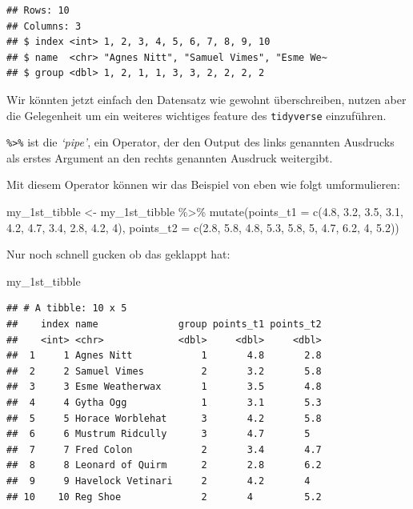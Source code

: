 \documentclass[
]{book}
\newenvironment{Shaded}{\begin{snugshade}}{\end{snugshade}}
\newcommand{\AttributeTok}[1]{\textcolor[rgb]{0.77,0.63,0.00}{#1}}
\newcommand{\DecValTok}[1]{\textcolor[rgb]{0.00,0.00,0.81}{#1}}
\newcommand{\FloatTok}[1]{\textcolor[rgb]{0.00,0.00,0.81}{#1}}
\newcommand{\FunctionTok}[1]{\textcolor[rgb]{0.00,0.00,0.00}{#1}}
\newcommand{\NormalTok}[1]{#1}
\newcommand{\OtherTok}[1]{\textcolor[rgb]{0.56,0.35,0.01}{#1}}
\newcommand{\SpecialCharTok}[1]{\textcolor[rgb]{0.00,0.00,0.00}{#1}}
\begin{document}
\begin{verbatim}
## Rows: 10
## Columns: 3
## $ index <int> 1, 2, 3, 4, 5, 6, 7, 8, 9, 10
## $ name  <chr> "Agnes Nitt", "Samuel Vimes", "Esme We~
## $ group <dbl> 1, 2, 1, 1, 3, 3, 2, 2, 2, 2
\end{verbatim}

Wir könnten jetzt einfach den Datensatz wie gewohnt überschreiben, nutzen aber die Gelegenheit um ein weiteres wichtiges feature des \texttt{tidyverse} einzuführen.

\texttt{\%\textgreater{}\%} ist die \emph{`pipe'}, ein Operator, der den Output des links genannten Ausdrucks als erstes Argument an den rechts genannten Ausdruck weitergibt.

Mit diesem Operator können wir das Beispiel von eben wie folgt umformulieren:

\begin{Shaded}
\begin{Highlighting}[]
\NormalTok{my\_1st\_tibble }\OtherTok{\textless{}{-}}\NormalTok{ my\_1st\_tibble }\SpecialCharTok{\%\textgreater{}\%} 
  \FunctionTok{mutate}\NormalTok{(}\AttributeTok{points\_t1 =} \FunctionTok{c}\NormalTok{(}\FloatTok{4.8}\NormalTok{, }\FloatTok{3.2}\NormalTok{, }\FloatTok{3.5}\NormalTok{, }\FloatTok{3.1}\NormalTok{, }\FloatTok{4.2}\NormalTok{, }\FloatTok{4.7}\NormalTok{, }\FloatTok{3.4}\NormalTok{, }\FloatTok{2.8}\NormalTok{, }\FloatTok{4.2}\NormalTok{, }\DecValTok{4}\NormalTok{),}
         \AttributeTok{points\_t2 =} \FunctionTok{c}\NormalTok{(}\FloatTok{2.8}\NormalTok{, }\FloatTok{5.8}\NormalTok{, }\FloatTok{4.8}\NormalTok{, }\FloatTok{5.3}\NormalTok{, }\FloatTok{5.8}\NormalTok{, }\DecValTok{5}\NormalTok{, }\FloatTok{4.7}\NormalTok{, }\FloatTok{6.2}\NormalTok{, }\DecValTok{4}\NormalTok{, }\FloatTok{5.2}\NormalTok{))}
\end{Highlighting}
\end{Shaded}

Nur noch schnell gucken ob das geklappt hat:

\begin{Shaded}
\begin{Highlighting}[]
\NormalTok{my\_1st\_tibble}
\end{Highlighting}
\end{Shaded}

\begin{verbatim}
## # A tibble: 10 x 5
##    index name              group points_t1 points_t2
##    <int> <chr>             <dbl>     <dbl>     <dbl>
##  1     1 Agnes Nitt            1       4.8       2.8
##  2     2 Samuel Vimes          2       3.2       5.8
##  3     3 Esme Weatherwax       1       3.5       4.8
##  4     4 Gytha Ogg             1       3.1       5.3
##  5     5 Horace Worblehat      3       4.2       5.8
##  6     6 Mustrum Ridcully      3       4.7       5  
##  7     7 Fred Colon            2       3.4       4.7
##  8     8 Leonard of Quirm      2       2.8       6.2
##  9     9 Havelock Vetinari     2       4.2       4  
## 10    10 Reg Shoe              2       4         5.2
\end{verbatim}
\end{document}
